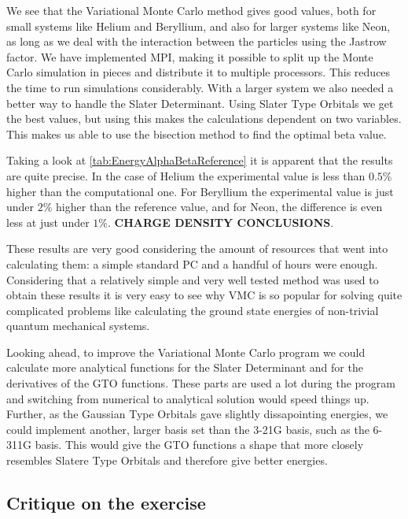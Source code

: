 We see that the Variational Monte Carlo method gives good values, both for small systems like Helium and Beryllium, and also for larger systems like Neon, as long as we deal with the interaction between the particles using the Jastrow factor. We have implemented MPI, making it possible to split up the Monte Carlo simulation in pieces and distribute it to multiple processors. This reduces the time to run simulations considerably. With a larger system we also needed a better way to handle the Slater Determinant. Using Slater Type Orbitals we get the best values, but using this makes the calculations dependent on two variables. This makes us able to use the bisection method to find the optimal beta value. 

Taking a look at \ref{tab:EnergyAlphaBetaReference} it is apparent that the results are quite precise. In the case of Helium the experimental value is less than $0.5\%$ higher than the computational one. For Beryllium the experimental value is just under $2\%$ higher than the reference value, and for Neon, the difference is even less at just under $1\%$. \textbf{CHARGE DENSITY CONCLUSIONS}. 

These results are very good considering the amount of resources that went into calculating them: a simple standard PC and a handful of hours were enough. Considering that a relatively simple and very well tested method was used to obtain these results it is very easy to see why VMC is so popular for solving quite complicated problems like calculating the ground state energies of non-trivial quantum mechanical systems.

Looking ahead, to improve the Variational Monte Carlo program we could calculate more analytical functions for the Slater Determinant and for the derivatives of the GTO functions. These parts are used a lot during the program and switching from numerical to analytical solution would speed things up. Further, as the Gaussian Type Orbitals gave slightly dissapointing energies, we could implement another, larger basis set than the 3-21G basis, such as the 6-311G basis. This would give the GTO functions a shape that more closely resembles Slatere Type Orbitals and therefore give better energies.  

\subsection{Critique on the exercise}
